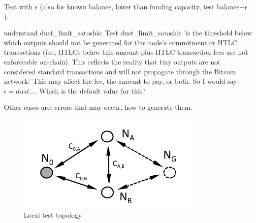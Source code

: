 Test with $\epsilon$ (also for known balance, lower than funding capacity, test balance+$\epsilon$).

understand dust\_limit\_satoshis: 
Test dust\_limit\_satoshis 'is the threshold below which outputs should not be generated for this node's commitment or HTLC transactions (i.e., HTLCs below this amount plus HTLC transaction fees are not enforceable on-chain). This reflects the reality that tiny outputs are not considered standard transactions and will not propagate through the Bitcoin network.'
This may affect the fee, the amount to pay, or both.
So I would say $\epsilon=dust\dots$.
Which is the default value for this?



Other cases are: errors that may occur, how to generate them.

\begin{figure}[h!]
    \centering
    \includegraphics[width=0.99\linewidth]{img/local-test-topology.pdf}
    \caption{Local test topology}
    \label{fig:local-test-topology}
\end{figure}




